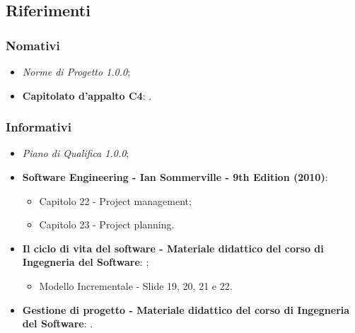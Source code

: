 \subsection{Riferimenti}
\subsubsection{Nomativi}
\begin{itemize}
    \item \textit{Norme di Progetto 1.0.0};
    \item \textbf{Capitolato\glo{} d'appalto C4}: \newline {}.
\end{itemize}

\subsubsection{Informativi}
\begin{itemize}
    \item \textit{Piano di Qualifica 1.0.0};
    \item \textbf{Software Engineering - Ian Sommerville - 9th Edition (2010)}:
        \begin{itemize}
            \item Capitolo 22 - Project management;
            \item Capitolo 23 - Project planning.
        \end{itemize}
    \item \textbf{Il ciclo di vita del software - Materiale didattico del corso di Ingegneria del Software}: \newline {};
        \begin{itemize}
            \item Modello Incrementale - Slide 19, 20, 21 e 22.
        \end{itemize}
    \item \textbf{Gestione di progetto - Materiale didattico del corso di Ingegneria del Software}: \newline {}.
\end{itemize}



